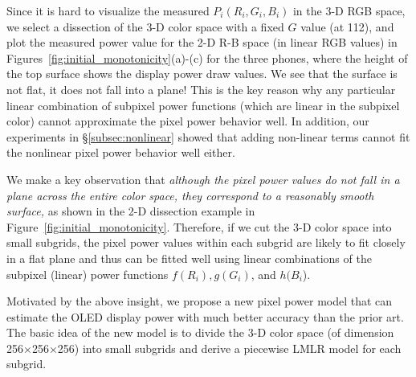 Since it is hard to visualize the measured $P_i(R_i, G_i,B_i)$ in the
3-D RGB space, we select a dissection of the 3-D color space with a fixed
$G$ value (at 112), and plot the measured power value for the 2-D R-B space (in
linear RGB values) in Figures~\ref{fig:initial_monotonicity}(a)-(c) for
the three phones, where the height of the top surface shows the display power
draw values.  We see that the surface is not flat, \ie it does not fall into a plane! This is
the key reason why any particular linear combination of subpixel power functions
(which are linear in the subpixel color) cannot approximate
the pixel power behavior well. In addition,
our experiments in \S\ref{subsec:nonlinear} showed
that adding non-linear terms cannot fit the nonlinear pixel power behavior well either.

We make a key observation that {\em although the pixel power values do not
fall in a plane across the entire color space, they correspond to a reasonably smooth surface,}
\eg as shown in the 2-D dissection example in Figure~\ref{fig:initial_monotonicity}. 
Therefore, if we cut the 3-D color space into small subgrids, the
pixel power values within each subgrid are likely to fit closely in
a flat plane and thus can be fitted well using linear combinations
of the subpixel (linear) power functions $f(R_{i}), g(G_i)$, and $h(B_i$).

Motivated by the above insight, we propose a new pixel power model
that can estimate the OLED display power with much better accuracy
than the prior art.  The basic idea of the new model is to divide the 3-D
color space (of dimension 256$\times$256$\times$256) into small subgrids
and derive a piecewise LMLR model for each subgrid.



